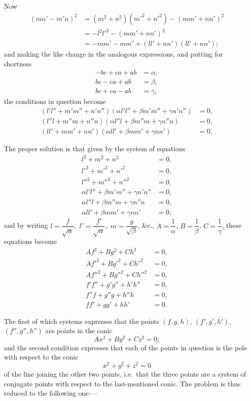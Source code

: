 \documentclass[12pt,a4paper]{article}
\theoremstyle{plain}
\begin{document}
Now
\begin{align*}
(mn'-m'n)^2&=(m^2+n^2)(m'^2+n'^2)-(mm'+nn')^2\\
&=-l^2l'^2-(mm'+nn')^2\\
&=-mm'-mm'+(ll'+nn')(ll'+nn');
\end{align*}
and making the like change in the analogous expressions, and putting for shortness
\begin{align*}
-bc+ca+ab&=\alpha,\\
bc-ca+ab&=\beta,\\
bc+ca-ab&=\gamma,
\end{align*}
the conditions in question become
\begin{align*}
(l'l''+m'm''+n'n'')(\alpha l'l''+\beta m'm''+\gamma n'n'')&=0,\\
(l''l+m''m+n''n)(\alpha l''l+\beta m''m+\gamma n''n)&=0,\\
(ll'+mm'+nn')(\alpha ll'+\beta mm'+\gamma nn')&=0.
\end{align*}

The proper solution is that given by the system of equations
\begin{align*}
l^2+m^2+n^2&=0,\\
l'^2+m'^2+n'^2&=0,\\
l''^2+m''^2+n''^2&=0,\\
\alpha l'l''+\beta m'm''+\gamma n'n''&=0,\\
\alpha l''l+\beta m''m+\gamma n''n&=0,\\
\alpha ll'+\beta mm'+\gamma nn'&=0;
\end{align*}
and by writing $l=\dfrac{f}{\sqrt{\alpha}}$, $\,l'=\dfrac{f'}{\sqrt{\alpha}}$, $\,m=\dfrac{g}{\sqrt{\beta}}$, \&c., $A=\dfrac{1}{\alpha}$, $B=\dfrac{1}{\beta}$, $C=\dfrac{1}{\gamma}$, these equations become
\begin{align*}
Af^2+Bg^2+Ch^2&=0,\\
Af'^2+Bg'^2+Ch'^2&=0,\\
Af''^2+Bg''^2+Ch''^2&=0,\\
f'f''+g'g''+h'h''&=0,\\
f''f+g''g+h''h&=0,\\
ff'+gg'+hh'&=0.
\end{align*}

The first of which systems expresses that the points $(f,g,h)$, $(f',g',h')$, $(f'',g'',h'')$ are points in the conic
\[
Ax^2+By^2+Cz^2=0;
\]
and the second condition expresses that each of the points in question is the pole with respect to the conic
\[
x^2+y^2+z^2=0
\]
of the line joining the other two points, i.e.\ that the three points are a system of conjugate points with respect to the last-mentioned conic. The problem is thus reduced to the following one:---
\end{document}
